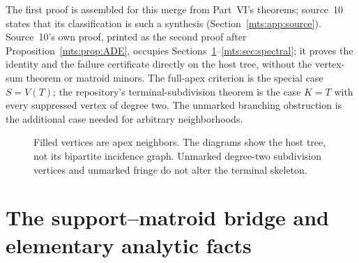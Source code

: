\documentclass[11pt]{article}
\numberwithin{equation}{section}
\theoremstyle{definition}
\begin{document}
The first proof is assembled for this merge from Part~VI's theorems; source~10
states that its classification is such a synthesis
(Section~\ref{mts:app:source}). Source~10's own proof, printed as the second
proof after Proposition~\ref{mts:prop:ADE}, occupies
Sections~\ref{mts:sec:bridge}--\ref{mts:sec:spectral}; it proves the
identity and the failure certificate directly on the host tree, without
the vertex-sum theorem or matroid minors.
The full-apex criterion is the special case $S=V(T)$; the repository's
terminal-subdivision theorem is the case $K=T$ with every suppressed
vertex of degree two. The unmarked branching obstruction is the additional
case needed for arbitrary neighborhoods.

\begin{figure}[htbp]
\centering
{}
\caption{Filled vertices are apex neighbors. The diagrams show the host tree,
not its bipartite incidence graph. Unmarked degree-two subdivision vertices
and unmarked fringe do not alter the terminal skeleton.}
\label{mts:fig:marked}
\end{figure}

\section{The support--matroid bridge and elementary analytic facts}\label{mts:sec:bridge}
\end{document}
